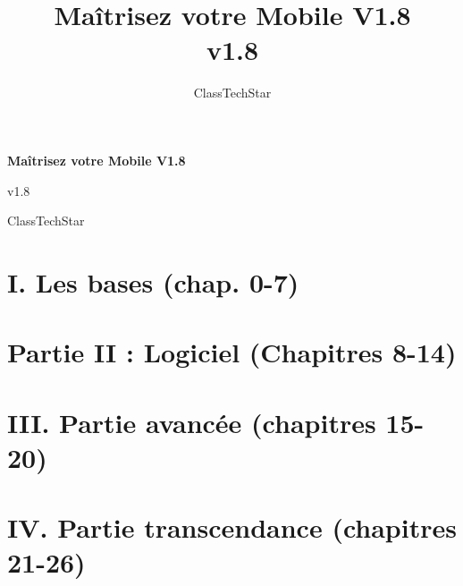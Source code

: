 \documentclass[11pt,a4paper,openany]{book}
\title{Maîtrisez votre Mobile V1.8\\ \large v1.8}
\author{ClassTechStar}
\date{}
\begin{document}
\begin{titlepage}
\centering
\vspace*{0.28\textheight}
{\Huge\bfseries Maîtrisez votre Mobile V1.8\par}
\vspace{1.2em}
{\Large v1.8\par}
\vfill
{\large ClassTechStar\par}
\end{titlepage}
\frontmatter
\tableofcontents
\mainmatter
\part*{I. Les bases (chap. 0-7)}










\part*{Partie II : Logiciel (Chapitres 8-14)}








\part*{III. Partie avancée (chapitres 15-20)}







\part*{IV. Partie transcendance (chapitres 21-26)}







\end{document}
